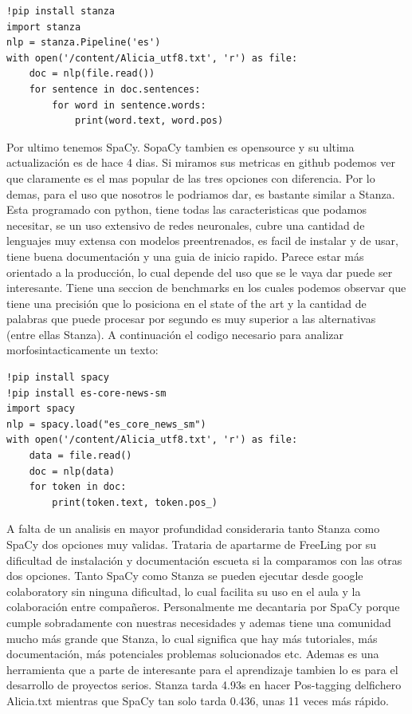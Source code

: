 \documentclass[11pt,a4paper]{report}
\begin{document}
	\begin{verbatim}
!pip install stanza
import stanza
nlp = stanza.Pipeline('es')
with open('/content/Alicia_utf8.txt', 'r') as file:
    doc = nlp(file.read())
    for sentence in doc.sentences:
        for word in sentence.words:
            print(word.text, word.pos)
    \end{verbatim}
    
    Por ultimo tenemos SpaCy. SopaCy tambien es opensource y su ultima actualización es de hace 4 dias. Si miramos sus metricas en github podemos ver que claramente es el mas popular de las tres opciones con diferencia. Por lo demas, para el uso que nosotros le podriamos dar, es bastante similar a Stanza. Esta programado con python, tiene todas las caracteristicas que podamos necesitar, se un uso extensivo de redes neuronales, cubre una cantidad de lenguajes muy extensa con modelos preentrenados, es facil de instalar y de usar, tiene buena documentación y una guia de inicio rapido. Parece estar más orientado a la producción, lo cual depende del uso que se le vaya dar puede ser interesante. Tiene una seccion de benchmarks en los cuales podemos observar que tiene una precisión que lo posiciona en el state of the art y la cantidad de palabras que puede procesar por segundo es muy superior a las alternativas (entre ellas Stanza). A continuación el codigo necesario para analizar morfosintacticamente un texto:
    
    	\begin{verbatim}
!pip install spacy
!pip install es-core-news-sm
import spacy
nlp = spacy.load("es_core_news_sm")
with open('/content/Alicia_utf8.txt', 'r') as file:
    data = file.read()
    doc = nlp(data)
    for token in doc:
        print(token.text, token.pos_)
    \end{verbatim}
    
    A falta de un analisis en mayor profundidad consideraria tanto Stanza como SpaCy dos opciones muy validas. Trataria de apartarme de FreeLing por su dificultad de instalación y documentación escueta si la comparamos con las otras dos opciones. Tanto SpaCy como Stanza se pueden ejecutar desde google colaboratory sin ninguna dificultad, lo cual facilita su uso en el aula y la colaboración entre compañeros. Personalmente me decantaria por SpaCy porque cumple sobradamente con nuestras necesidades y ademas tiene una comunidad mucho más grande que Stanza, lo cual significa que hay más tutoriales, más documentación, más potenciales problemas solucionados etc. Ademas es una herramienta que a parte de interesante para el aprendizaje tambien lo es para el desarrollo de proyectos serios. Stanza tarda 4.93s en hacer Pos-tagging delfichero Alicia.txt mientras que SpaCy tan solo tarda 0.436, unas 11 veces más rápido.
    
\end{document}

